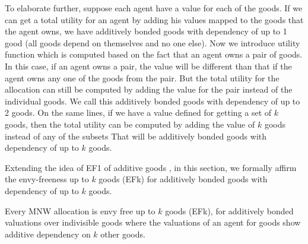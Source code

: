 To elaborate further, suppose each agent have a value for each of the goods. If we can get a total utility for an agent by adding his values mapped to the goods that the agent owns, we have additively bonded goods with dependency of up to 1 good (all goods depend on themselves and no one else). Now we introduce utility function which is computed based on the fact that an agent owns a pair of goods. In this case, if an agent owns a pair, the value will be different than that if the agent owns any one of the goods from the pair. But the total utility for the allocation can still be computed by adding the value for the pair instead of the individual goods. We call this additively bonded goods with dependency of up to 2 goods. On the same lines, if we have a value defined for getting a set of $k$ goods, then the total utility can be computed by adding the value of $k$ goods instead of any of the subsets That will be additively bonded goods with dependency of up to $k$ goods.

Extending the idea of EF1 of additive goods \cite{caragiannis2016unreasonable}, in this section, we formally affirm the envy-freeness up to $k$ goods (EFk) for additively bonded goods with dependency of up to $k$ goods.

\begin{theorem}
Every MNW allocation is envy free up to $k$ goods (EFk), for additively bonded valuations over indivisible goods where the valuations of an agent for goods show additive dependency on $k$ other goods.
\end{theorem}

